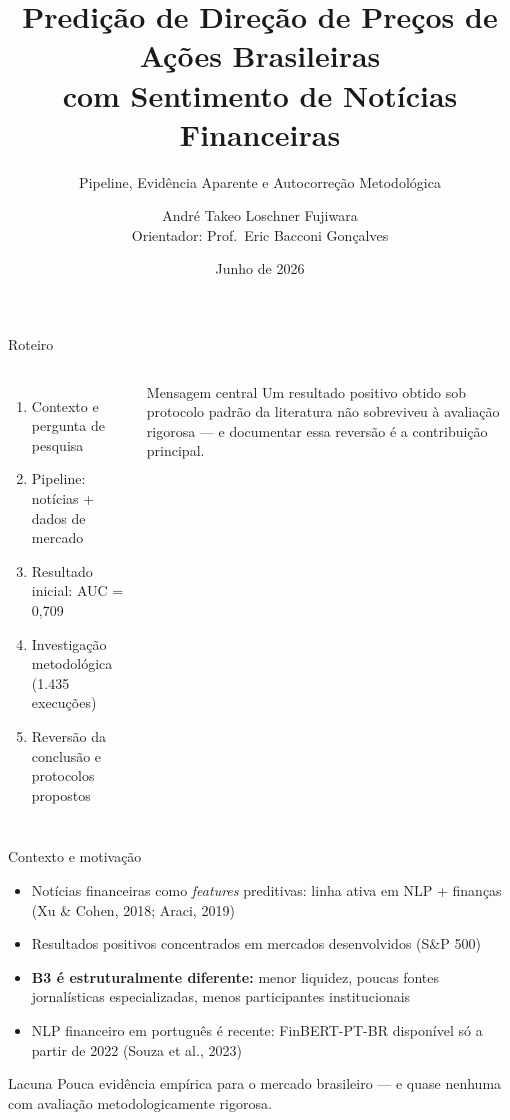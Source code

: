 \documentclass[11pt,aspectratio=169]{beamer}
\title[Sentimento de Notícias e Predição na B3]{Predição de Direção de Preços de Ações Brasileiras\\com Sentimento de Notícias Financeiras}
\subtitle{Pipeline, Evidência Aparente e Autocorreção Metodológica}
\author[André Takeo L. Fujiwara]{André Takeo Loschner Fujiwara\\[1ex]{\small Orientador: Prof.\ Eric Bacconi Gonçalves}}
\institute[PUC-SP]{Ciência de Dados e Inteligência Artificial --- PUC-SP}
\date{Junho de 2026}
\begin{document}
\begin{frame}[plain]
  \titlepage
\end{frame}

\begin{frame}{Roteiro}
  \begin{columns}[T]
    \begin{enumerate}
      \item Contexto e pergunta de pesquisa
      \item Pipeline: notícias + dados de mercado
      \item Resultado inicial: AUC = 0{,}709
      \item Investigação metodológica (1.435 execuções)
      \item Reversão da conclusão e protocolos propostos
    \end{enumerate}
    \begin{block}{Mensagem central}
      Um resultado positivo obtido sob protocolo padrão da literatura
      \alert{não sobreviveu} à avaliação rigorosa --- e documentar essa
      reversão é a contribuição principal.
    \end{block}
  \end{columns}
\end{frame}

\begin{frame}{Contexto e motivação}
  \begin{itemize}
    \item Notícias financeiras como \textit{features} preditivas: linha ativa em NLP + finanças (Xu \& Cohen, 2018; Araci, 2019)
    \item Resultados positivos concentrados em mercados desenvolvidos (S\&P 500)
    \item \textbf{B3 é estruturalmente diferente:} menor liquidez, poucas fontes jornalísticas especializadas, menos participantes institucionais
    \item NLP financeiro em português é recente: FinBERT-PT-BR disponível só a partir de 2022 (Souza et al., 2023)
  \end{itemize}
  \vspace{1ex}
  \begin{block}{Lacuna}
    Pouca evidência empírica para o mercado brasileiro --- e quase nenhuma
    com avaliação metodologicamente rigorosa.
  \end{block}
\end{frame}
\end{document}
